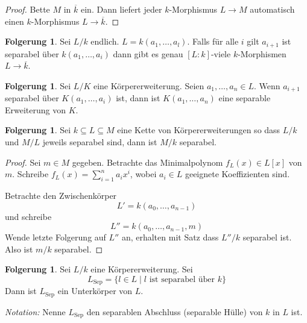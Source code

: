 \documentclass[12pt,parskip=full]{scrartcl}
\theoremstyle{definition}
\newtheorem{corollary}[theorem]{Folgerung}
\theoremstyle{remark}
\begin{document}
	\begin{proof}
		Bette $M$ in $\overline{k}$ ein. Dann liefert jeder $k$-Morphismus $L \to M$ automatisch einen $k$-Morphismus $L \to \overline{k}$.
	\end{proof}

	\begin{corollary}
		Sei $L/k$ endlich. $L = k(a_1, \dots, a_l)$. Falls für alle $i$ gilt $a_{i+1}$ ist separabel über $k(a_1, \dots, a_i)$ dann gibt es genau $[L:k]$-viele $k$-Morphismen $L \to \overline{k}$.
	\end{corollary}

	\begin{corollary}
		Sei $L/K$ eine Körpererweiterung. Seien $a_1, \dots, a_n \in L$. Wenn $a_{i+1}$ separabel über $K(a_1, \dots, a_i)$ ist, dann ist $K(a_1, \dots, a_n)$ eine separable Erweiterung von $K$. 
	\end{corollary}

	\begin{corollary}
		Sei $k \subseteq L \subseteq M$ eine Kette von Körpererweiterungen so dass $L/k$ und $M/L$ jeweils separabel sind, dann ist $M/k$ separabel.
	\end{corollary}

	\begin{proof}
		Sei $m \in M$ gegeben. Betrachte das Minimalpolynom $f_L(x) \in L[x]$ von $m$. Schreibe $f_L(x) = \sum_{i=1}^n a_i x^i$, wobei $a_i \in L$ geeignete Koeffizienten sind.
		
		Betrachte den Zwischenkörper
		\begin{equation*}
			L' = k(a_0, \dots, a_{n-1})
		\end{equation*}
		und schreibe
		\begin{equation*}
			L'' = k(a_0, \dots, a_{n-1}, m)
		\end{equation*}
		Wende letzte Folgerung auf $L''$ an, erhalten mit Satz dass $L''/k$ separabel ist. Also ist $m/k$ separabel.
	\end{proof}

	\begin{corollary}
		Sei $L/k$ eine Körpererweiterung. Sei
		\begin{equation*}
			L_\text{Sep} = \{ l \in L \mid \text{$l$ ist separabel über $k$} \}
		\end{equation*}
		Dann ist $L_\text{Sep}$ ein Unterkörper von $L$.
		
		\textit{Notation:} Nenne $L_\text{Sep}$ den separablen Abschluss (separable Hülle) von $k$ in $L$ ist.
	\end{corollary}
\end{document}
